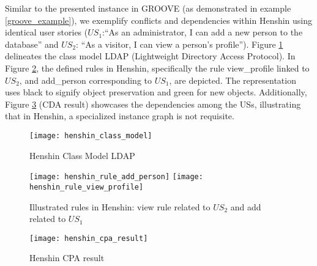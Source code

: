 \begin{example}
Similar to the presented instance in GROOVE (as demonstrated in example \ref{groove_example}), we exemplify conflicts and dependencies within Henshin using identical user stories ($US_1$:\enquote{As an administrator, I can add a new person to the database} and $US_2$: \enquote{As a visitor, I can view a person's proﬁle}). Figure \ref{fig:henshin_model} delineates the  class model LDAP (Lightweight Directory Access Protocol). In Figure \ref{fig:henshin_rule}, the defined rules in Henshin, specifically the rule view\_profile linked to $US_2$, and add\_person corresponding to $US_1$, are depicted. The representation uses black to signify object preservation and green for new objects. Additionally, Figure \ref{henshin_cpa_result} (CDA result) showcases the dependencies among the USs, illustrating that in Henshin, a specialized instance graph is not requisite.
\begin{figure}
\center
\texttt{[image: henshin\_class\_model]}
\caption{Henshin Class Model LDAP}\label{fig:henshin_model}
\end{figure}
\begin{figure}
\texttt{[image: henshin\_rule\_add\_person]}
\texttt{[image: henshin\_rule\_view\_profile]}
\caption{Illustrated rules in Henshin: view rule related to $US_2$ and add related to $US_1$}\label{fig:henshin_rule}
\end{figure}
\begin{figure}
\center
\texttt{[image: henshin\_cpa\_result]}
\caption{Henshin CPA result}\label{henshin_cpa_result}
\end{figure}
\end{example}


